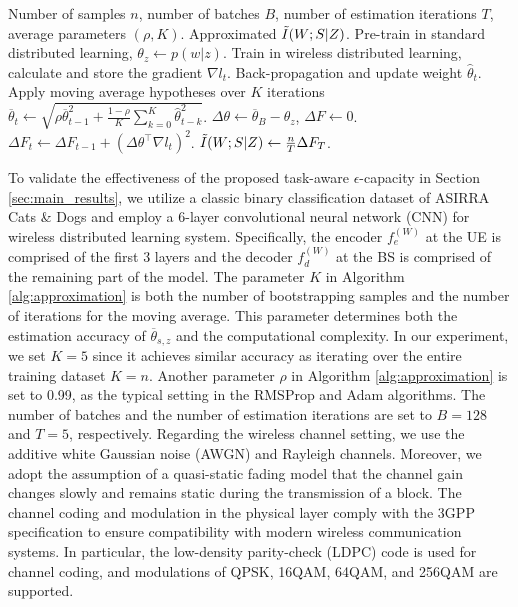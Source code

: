 \documentclass[lettersize,journal]{IEEEtran}
\theoremstyle{definition}
\theoremstyle{plain}
\begin{document}
\begin{algorithm}
    \fontsize{9pt}{9pt}\selectfont
    \caption{Efficient approximation of conditional mutual information $I(W;S|Z)$}
    \label{alg:approximation}
    \begin{algorithmic}[1]
        \REQUIRE Number of samples $n$, number of batches $B$, number of estimation iterations $T$, average parameters $(\rho,K)$.
        \ENSURE Approximated $\Tilde{I}(W;S|Z)$.
        \STATE Pre-train in standard distributed learning, $\theta_z\gets p(w|z)$.
            \STATE Train in wireless distributed learning, calculate and store the gradient $\nabla l_t$.
            \STATE Back-propagation and update weight $\hat{\theta}_t$.
            \STATE Apply moving average hypotheses over $K$ iterations $\overline{\theta}_t\gets \sqrt{\rho \overline{\theta}_{t-1}^2 + \frac{1-\rho}{K}\sum_{k=0}^K\hat{\theta}_{t-k}^2}$.
        \ENDFOR
        \STATE $\Delta\theta\gets \overline{\theta}_B - \theta_z$, $\Delta F\gets 0$.
            \STATE $\Delta F_t\gets \Delta F_{t-1} + (\Delta\theta ^\top \nabla l_t)^2$.
        \ENDFOR
        \STATE $\Tilde{I}(W;S|Z)\gets \frac{n}{T}\Delta F_T$.
    \end{algorithmic}
\end{algorithm}


To validate the effectiveness of the proposed task-aware $\epsilon$-capacity in Section \ref{sec:main_results}, we utilize a classic binary classification dataset of ASIRRA Cats \& Dogs \cite{dogs-vs-cats} and employ a 6-layer convolutional neural network (CNN) for wireless distributed learning system.
Specifically, the encoder $f_e^{(W)}$ at the UE is comprised of the first 3 layers and the decoder $f_d^{(W)}$ at the BS is comprised of the remaining part of the model. The parameter $K$ in Algorithm \ref{alg:approximation} is both the number of bootstrapping samples and the number of iterations for the moving average. This parameter determines both the estimation accuracy of $\overline{\theta}_{s,z}$ and the computational complexity. In our experiment, we set $K=5$ since it achieves similar accuracy as iterating over the entire training dataset $K=n$. Another parameter $\rho$ in Algorithm \ref{alg:approximation} is set to 0.99, as the typical setting in the RMSProp and Adam algorithms. The number of batches and the number of estimation iterations are set to $B=128$ and $T=5$, respectively.
Regarding the wireless channel setting, we use the additive white Gaussian noise (AWGN) and Rayleigh channels. 
Moreover, we adopt the assumption of a quasi-static fading model that the channel gain changes slowly and remains static during the transmission of a block.
The channel coding and modulation in the physical layer comply with the 3GPP specification \cite{3GPP-38.214} to ensure compatibility with modern wireless communication systems. In particular, the low-density parity-check (LDPC) code is used for channel coding, and modulations of QPSK, 16QAM, 64QAM, and 256QAM are supported. 
\end{document}
